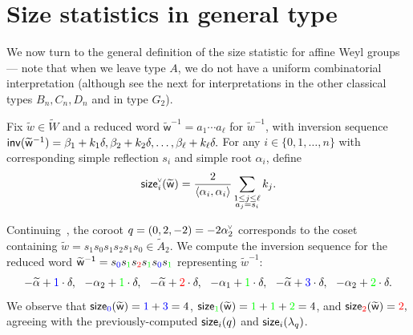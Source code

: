 \documentclass[ALCO,published]{cedram}
\newcommand{\chk}[1]{#1^{\normalfont\smash{\scalebox{.5}[.5]{\rotatebox{90}{\textbf{\textless}}}}}}
\newcommand{\wa}{\widetilde{W}}
\newcommand{\waf}{\widetilde{w}}
\newcommand{\size}{{\sf size}}
\newcommand{\inv}{{\sf inv}}
\begin{document}
\section{Size statistics in general type}
\label{sec:size_gen}

We now turn to the general definition of the size statistic for affine Weyl groups--- note that when we leave type $A$, we do not have a uniform combinatorial interpretation (although see the next  for interpretations in the other classical types $B_n,C_n,D_n$ and in type $G_2$).%

\begin{defi}
\label{def:sizewords}
Fix $\waf \in \wa$ and a reduced word $\mathsf{\waf}^{-1}=a_1 \cdots a_{\ell}$ for $\waf^{-1}$, with inversion sequence $\inv(\mathsf{\waf}^{-1})=\beta_1+k_1\delta,\beta_2+k_2\delta,\ldots,\beta_\ell+k_\ell\delta.$   For any $i \in \{0,1,\ldots,n\}$ with corresponding simple reflection $s_i$ and simple root $\alpha_i$, define
\begin{equation*}
\chk{\size}_i(\mathsf{\waf}) =\frac{2}{\left\langle \alpha_i, \alpha_i\right\rangle}  \sum_{\substack{1\leq j \leq \ell \\ a_j=s_i}} k_j .
\end{equation*}
\end{defi}

\begin{exam}
\label{ex:a2}
Continuing~, the coroot $q=(0,2,-2)=-2\chk{\alpha_2}$ corresponds to the coset containing $\waf = s_1s_0s_1s_2s_1s_0 \in \widetilde{A}_2$. We compute the inversion sequence for the reduced word $\mathsf{\waf^{-1}} = s_{\textcolor{blue}{0}}s_{\textcolor{green}{1}}s_{\textcolor{red}{2}}s_{\textcolor{green}{1}}s_{\textcolor{blue}{0}}s_{\textcolor{green}{1}}$ representing $\waf^{-1}$:
\[
-\widetilde{\alpha}+\textcolor{blue}{1}\cdot\delta,~~
-\alpha_2+\textcolor{green}{1}\cdot\delta,~~
-\widetilde{\alpha}+\textcolor{red}{2}\cdot\delta,~~
-\alpha_1+\textcolor{green}{1}\cdot\delta,~~
-\widetilde{\alpha}+\textcolor{blue}{3}\cdot\delta,~~
-\alpha_2+\textcolor{green}{2}\cdot\delta.\]
We observe that $\size_{\textcolor{blue}{0}}(\mathsf{\waf})=\textcolor{blue}{1}+\textcolor{blue}{3}=4$, 
    $\size_{\textcolor{green}{1}}(\mathsf{\waf})=\textcolor{green}{1}+\textcolor{green}{1}+\textcolor{green}{2}=4$, and 
    $\size_{\textcolor{red}{2}}(\mathsf{\waf})=\textcolor{red}{2},$
agreeing with the previously-computed $\size_i(q)$ and $\size_i(\lambda_q)$.
\end{exam}
\end{document}
